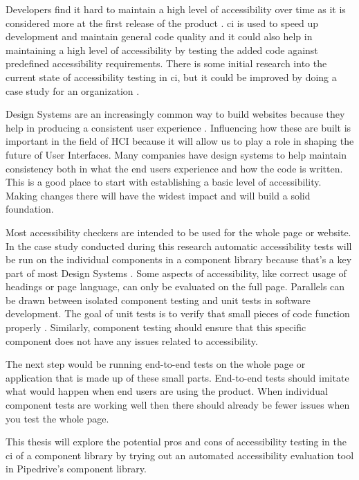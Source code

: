 \documentclass{master_thesis}
\begin{document}
Developers find it hard to maintain a high level of accessibility over time as it is considered more at the first release of the product \citep{Paterno2020}. \ac{ci} is used to speed up development and maintain general code quality \citep{Zhao2017} and it could also help in maintaining a high level of accessibility by testing the added code against predefined accessibility requirements. There is some initial research into the current state of accessibility testing in \ac{ci}, but it could be improved by doing a case study for an organization \citep{Sane2021, KelseyAdkins2022}.

Design Systems are an increasingly common way to build websites because they help in producing a consistent user experience \citep{Yew2020}. Influencing how these are built is important in the field of HCI because it will allow us to play a role in shaping the future of User Interfaces. Many companies have design systems to help maintain consistency both in what the end users experience and how the code is written. This is a good place to start with establishing a basic level of accessibility. Making changes there will have the widest impact and will build a solid foundation.

Most accessibility checkers are intended to be used for the whole page or website. In the case study conducted during this research automatic accessibility tests will be run on the individual components in a component library because that's a key part of most Design Systems \citep{Yew2020}. Some aspects of accessibility, like correct usage of headings or page language, can only be evaluated on the full page. Parallels can be drawn between isolated component testing and unit tests in software development. The goal of unit tests is to verify that small pieces of code function properly \citep[p.60]{Humble2010}. Similarly, component testing should ensure that this specific component does not have any issues related to accessibility.

The next step would be running end-to-end tests on the whole page or application that is made up of these small parts. End-to-end tests should imitate what would happen when end users are using the product. When individual component tests are working well then there should already be fewer issues when you test the whole page.

This thesis will explore the potential pros and cons of accessibility testing in the \ac{ci} of a component library by trying out an automated accessibility evaluation tool in Pipedrive's component library.
\end{document}
